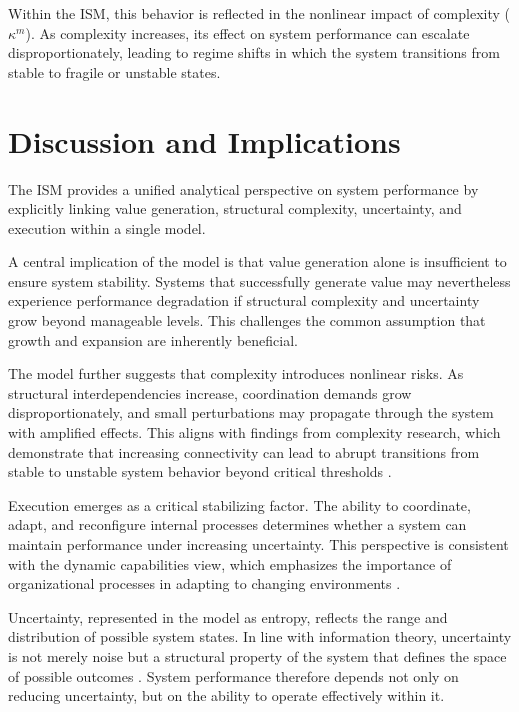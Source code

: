 \documentclass[11pt,a4paper]{article}
\theoremstyle{definition}
\begin{document}
Within the \ac{ISM}, this behavior is reflected in the nonlinear impact of complexity ($\kappa^m$).
As complexity increases, its effect on system performance can escalate disproportionately, leading to regime shifts in which the system transitions from stable to fragile or unstable states.


\section{Discussion and Implications}
\label{sec:discussion}

The \ac{ISM} provides a unified analytical perspective on system performance by explicitly linking value generation, structural complexity, uncertainty, and execution within a single model.

A central implication of the model is that value generation alone is insufficient to ensure system stability.
Systems that successfully generate value may nevertheless experience performance degradation if structural complexity and uncertainty grow beyond manageable levels.
This challenges the common assumption that growth and expansion are inherently beneficial.

The model further suggests that complexity introduces nonlinear risks.
As structural interdependencies increase, coordination demands grow disproportionately, and small perturbations may propagate through the system with amplified effects.
This aligns with findings from complexity research, which demonstrate that increasing connectivity can lead to abrupt transitions from stable to unstable system behavior beyond critical thresholds \parencite{may1972}.

Execution emerges as a critical stabilizing factor.
The ability to coordinate, adapt, and reconfigure internal processes determines whether a system can maintain performance under increasing uncertainty.
This perspective is consistent with the dynamic capabilities view, which emphasizes the importance of organizational processes in adapting to changing environments \parencite{teece1997}.

Uncertainty, represented in the model as entropy, reflects the range and distribution of possible system states.
In line with information theory, uncertainty is not merely noise but a structural property of the system that defines the space of possible outcomes \parencite{shannon1948a, shannon1948b}.
System performance therefore depends not only on reducing uncertainty, but on the ability to operate effectively within it.
\end{document}
